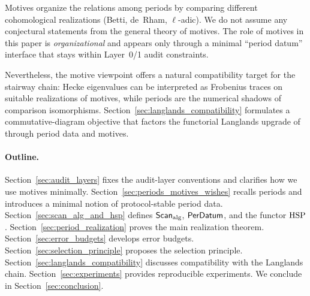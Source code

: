 Motives organize the relations among periods by comparing different cohomological realizations (Betti, de~Rham, $\ell$-adic). We do not assume any conjectural statements from the general theory of motives. The role of motives in this paper is \emph{organizational} and appears only through a minimal ``period datum'' interface that stays within Layer~0/1 audit constraints.

Nevertheless, the motive viewpoint offers a natural compatibility target for the stairway chain: Hecke eigenvalues can be interpreted as Frobenius traces on suitable realizations of motives, while periods are the numerical shadows of comparison isomorphisms. Section~\ref{sec:langlands_compatibility} formulates a commutative-diagram objective that factors the functorial Langlands upgrade of \cite{Ma2025STI} through period data and motives.

\paragraph{Outline.}
Section~\ref{sec:audit_layers} fixes the audit-layer conventions and clarifies how we use motives minimally. Section~\ref{sec:periods_motives_wishes} recalls periods and introduces a minimal notion of protocol-stable period data. Section~\ref{sec:scan_alg_and_hsp} defines $\mathsf{Scan}_{\mathrm{alg}}$, $\mathsf{PerDatum}$, and the functor $\mathrm{HSP}$. Section~\ref{sec:period_realization} proves the main realization theorem. Section~\ref{sec:error_budgets} develops error budgets. Section~\ref{sec:selection_principle} proposes the selection principle. Section~\ref{sec:langlands_compatibility} discusses compatibility with the Langlands chain. Section~\ref{sec:experiments} provides reproducible experiments. We conclude in Section~\ref{sec:conclusion}.


